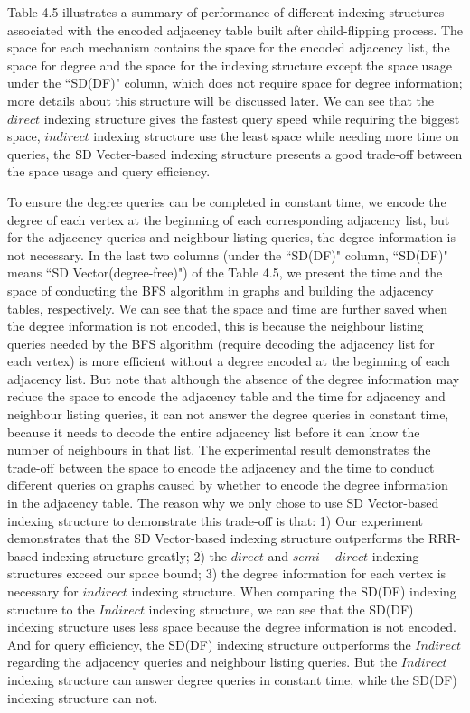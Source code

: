 \documentclass[12pt,glossary]{dalthesis}
\begin{document}
\bigskip

Table 4.5 illustrates a summary of performance of different indexing structures associated with the encoded adjacency table built after child-flipping process. The space for each mechanism contains the space for the encoded adjacency list, the space for degree and the space for the indexing structure except the space usage under the ``SD(DF)" column, which does not require space for degree information; more details about this structure will be discussed later. We can see that the $direct$ indexing structure gives the fastest query speed while requiring the biggest space, $indirect$ indexing structure use the least space while needing more time on queries, the SD Vecter-based indexing structure presents a good trade-off between the space usage and query efficiency. 

\bigskip
\bigskip

To ensure the degree queries can be completed in constant time, we encode the degree of each vertex at the beginning of each corresponding adjacency list, but for the adjacency queries and neighbour listing queries, the degree information is not necessary. In the last two columns (under the ``SD(DF)" column, ``SD(DF)" means ``SD Vector(degree-free)") of the Table 4.5, we present the time and the space of conducting the BFS algorithm in graphs and building the adjacency tables, respectively. We can see that the space and time are further saved when the degree information is not encoded, this is because the neighbour listing queries needed by the BFS algorithm (require decoding the adjacency list for each vertex) is more efficient without a degree encoded at the beginning of each adjacency list. But note that although the absence of the degree information may reduce the space to encode the adjacency table and the time for adjacency and neighbour listing queries, it can not answer the degree queries in constant time, because it needs to decode the entire adjacency list before it can know the number of neighbours in that list. The experimental result demonstrates the trade-off between the space to encode the adjacency and the time to conduct different queries on graphs caused by whether to encode the degree information in the adjacency table. The reason why we only chose to use SD Vector-based indexing structure to demonstrate this trade-off is that: 1) Our experiment demonstrates that the SD Vector-based indexing structure outperforms the RRR-based indexing structure greatly; 2) the $direct$ and $semi-direct$ indexing structures exceed our space bound; 3) the degree information for each vertex is necessary for $indirect$ indexing structure. When comparing the SD(DF) indexing structure to the $Indirect$ indexing structure, we can see that the SD(DF) indexing structure uses less space because the degree information is not encoded. And for query efficiency, the SD(DF) indexing structure outperforms the $Indirect$ regarding the adjacency queries and neighbour listing queries. But the $Indirect$ indexing structure can answer degree queries in constant time, while the SD(DF) indexing structure can not.  
\end{document}
